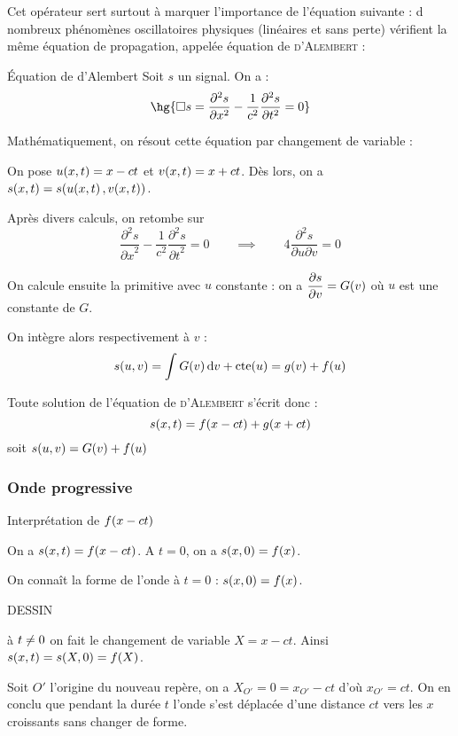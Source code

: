 \documentclass[a4paper,french,bookmarks]{book}
\begin{document}
    Cet opérateur sert surtout à marquer l'importance de l'équation suivante : d nombreux phénomènes oscillatoires physiques (linéaires et sans perte) vérifient la même équation de propagation, appelée équation de \textsc{d'Alembert} :
    \begin{definition}{Équation de d'Alembert}{}
        Soit $s$ un signal. On a :
        \[ \hg{\Box s = \dfrac{\partial^2s}{\partial x^2} - \dfrac{1}{c^2}\dfrac{\partial^2s}{\partial t^2} = 0}\]
    \end{definition}
    Mathématiquement, on résout cette équation par changement de variable :
    \begin{enumerate}
        \itt On pose $u\!\left(x, t\right) = x - ct$ et $v\!\left(x, t\right) = x + ct$. Dès lors, on a
        $s\!\left(x, t\right) = s\!\left(u\!\left(x, t\right), v\!\left(x, t\right)\right)$. 
        
        Après divers calculs, on retombe sur
        \[ \frac{\partial^2 s}{{\partial x}^2} - \frac{1}{c^2}\frac{\partial^2 s}{{\partial t}^2} = 0 \qquad\implies\qquad 4\frac{\partial^2 s}{\partial u \partial v} = 0 \]
        
        \itt On calcule ensuite la primitive avec $u$ constante : on a $\dfrac{\partial s}{\partial v} = G\!\left(v\right)$ où $u$ est une constante de $G$.
    
        On intègre alors respectivement à $v$ :
        \[ s\!\left(u, v\right) = \int G \!\left(v\right) \mathrm d v + \text{cte}\!\left(u\right) = g\!\left(v\right) + f\!\left(u\right)\]
        
        \itt Toute solution de l'équation de \textsc{d'Alembert} s'écrit donc :
        \[ s\!\left(x, t\right) = f\!\left(x - ct\right) + g\!\left(x + ct\right)\]
       soit $s\!\left(u, v\right) = G\!\left(v\right) + f\!\left(u\right)$
    \end{enumerate}

    \subsubsection{Onde progressive}

    Interprétation de $f\!\left(x - ct\right)$
    
    \begin{nproof}
        On a $s\!\left(x, t\right) = f\!\left(x - ct\right)$. A $t = 0$, on a $s\!\left(x, 0\right) = f\!\left(x\right)$.
        
        On connaît la forme de l'onde à $t = 0$ : \qquad $s\!\left(x, 0\right) = f\!\left(x\right)$.
        
        DESSIN

        à $t \not\eq 0$ on fait le changement de variable $X = x - ct$. Ainsi $s\!\left(x, t\right) = s\!\left(X, 0\right) = f\!\left(X\right)$.
        
        Soit $O'$ l'origine du nouveau repère, on a $X_{O'} = 0 = x_{O'} - ct$ d'où $x_{O'} = ct$. On en conclu que pendant la durée $t$ l'onde s'est déplacée d'une distance $ct$ vers les $x$ croissants sans changer de forme.
    \end{nproof}
\end{document}

